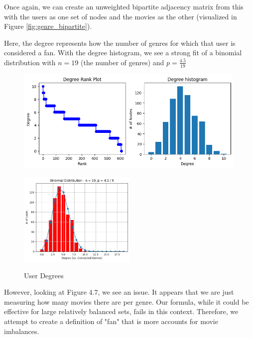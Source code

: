 \documentclass[12pt]{article}
\numberwithin{equation}{section}
\begin{document}
Once again, we can create an unweighted bipartite adjacency matrix from this with the users as one set of nodes and the movies as the other (visualized in Figure \ref{fig:genre_bipartite}).

Here, the degree represents how the number of genres for which that user is considered a fan. With the degree histogram, we see a strong fit of a binomial distribution with $n = 19$ (the number of genres) and $p = \frac{4.5}{19}$

\begin{figure}[h!]
    \begin{minipage}[b]{1\linewidth}
         \centering
  	\includegraphics[width=0.99\textwidth]{genre_degree1.png}
  	\label{fig:fanspergenre}
	 \caption{User Degrees}
    \end{minipage}
    \vspace{0.1cm}
    \begin{minipage}[b]{1\linewidth}
         \centering
  	\includegraphics[width=0.5\textwidth]{binomialfit.png}
  	\label{fig:fanspergenre}
    \end{minipage}
\end{figure}

However, looking at Figure 4.7, we see an issue. It appears that we are just measuring how many movies there are per genre. Our formula, while it could be effective for large relatively balanced sets, fails in this context. Therefore, we attempt to create a definition of "fan" that is more accounts for movie imbalances.
\end{document}

